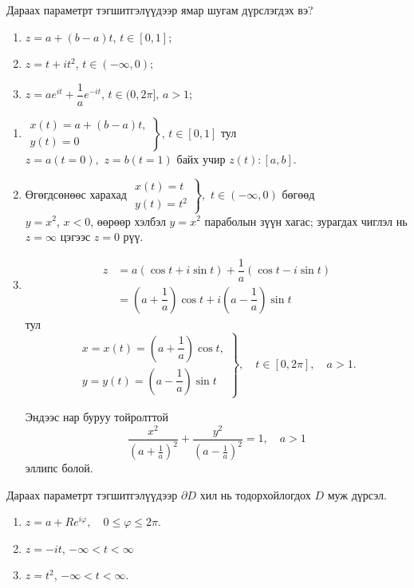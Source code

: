 \begin{exm}
Дараах параметрт тэгшитгэлүүдээр ямар шугам дүрслэгдэх вэ? 
\begin{enumerate}
    \item $z=a+(b-a)t$, \qquad $t\in [0,1];$
    \item $z=t+it^2$, \qquad $t\in (-\infty, 0);$
    \item $z=ae^{it}+\dfrac{1}{a}e^{-it}$, \quad $t\in (0, 2\pi]$, $a>1$;
\end{enumerate}
\end{exm}
\begin{sol}
\begin{enumerate}
    \item $\left.\begin{array} {c}
x(t)=a+(b-a)t, \\
y(t)=0
\end{array}\right\}$, $t\in [0,1]$ тул \\
$z=a(t=0),$ $z=b(t=1)$ байх учир $z(t):[a,b].$
\item 
Өгөгдсөнөөс харахад $ \left.
\begin{array}{c}
x(t)=t \\
y(t)=t^2
\end{array} \right\},$ $t\in (-\infty, 0)$ бөгөөд \\
$y=x^2$, $x<0$, өөрөөр хэлбэл $y=x^2$ параболын зүүн хагас; зурагдах чиглэл нь $z=\infty$ цэгээс $z=0$ рүү. 
\item 
\begin{align*}
    z&=a(\cos t +i\sin t)+\dfrac{1}{a}(\cos t-i\sin t) \\
    &=\left( a+\dfrac{1}{a}\right)\cos t+i\left(a-\dfrac{1}{a}\right)\sin t
\end{align*}
 тул 
 $$\left.\begin{array}{c}
x=x(t)=\left(a+\dfrac{1}{a}\right)\cos t, \\
y=y(t)=\left(a-\dfrac{1}{a}\right) \sin t
\end{array} \right\}, \quad t\in [0,2\pi], \quad a>1.$$

Эндээс нар буруу тойролттой 
$$\frac{x^2}{\left(a+\frac{1}{a}\right)^2}+\frac{y^2}{\left(a-\frac{1}{a}\right)^2}=1, \quad a>1$$  эллипс болой. 
\end{enumerate} 
\end{sol}
\begin{exm}
Дараах параметрт тэгшитгэлүүдээр $\partial D$ хил нь тодорхойлогдох $D$ муж дүрсэл.
\begin{enumerate}
    \item $z=a+Re^{i\varphi}, \quad 0\leq \varphi \leq 2\pi.$
    \item $z=-it$, \quad $-\infty <t<\infty$
    \item $z=t^2$, \quad $-\infty <t<\infty.$
\end{enumerate}
\end{exm}
